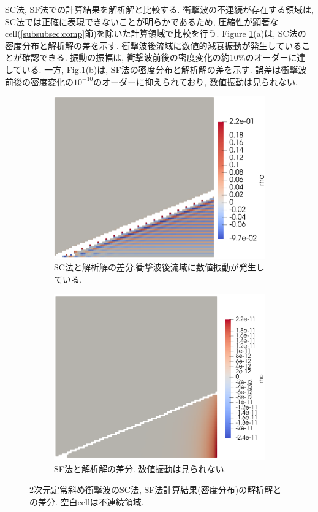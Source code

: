\documentclass[a4j]{jarticle}
\begin{document}
SC法, SF法での計算結果を解析解と比較する.
衝撃波の不連続が存在する領域は, SC法では正確に表現できないことが明らかであるため,
圧縮性が顕著なcell(\ref{subsubsec:comp}節)を除いた計算領域で比較を行う.
Figure \ref{fig:2Ddiagcomp}(a)は, SC法の密度分布と解析解の差を示す.
衝撃波後流域に数値的減衰振動が発生していることが確認できる.
振動の振幅は, 衝撃波前後の密度変化の約10\%のオーダーに達している.
一方, Fig.\ref{fig:2Ddiagcomp}(b)は, SF法の密度分布と解析解の差を示す.
誤差は衝撃波前後の密度変化の$10^{-10}$のオーダーに抑えられており, 数値振動は見られない.
\begin{figure}[h]
  \centering
  \begin{subfigure}[t]{0.45\textwidth}
    \centering
    \includegraphics[width=\linewidth]{2Ddiagcompa.pdf}
    \caption{SC法と解析解の差分.衝撃波後流域に数値振動が発生している. }
  \end{subfigure}
  \hfill
  \begin{subfigure}[b]{0.45\textwidth}
    \centering
    \includegraphics[width=\linewidth]{2Ddiagcompb.pdf}
    \caption{SF法と解析解の差分. 数値振動は見られない.}
  \end{subfigure}
  \caption{2次元定常斜め衝撃波のSC法, SF法計算結果(密度分布)の解析解との差分. 空白cellは不連続領域.}
  \label{fig:2Ddiagcomp}
\end{figure}
\end{document}
